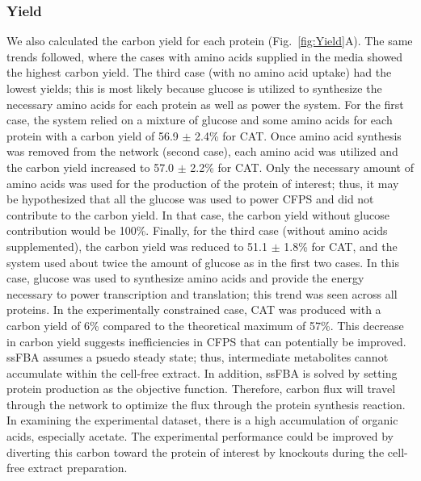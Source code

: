 \documentclass[journal=asbcd6,manuscript=article]{achemso}
\begin{document}
\subsubsection{Yield}
We also calculated the carbon yield for each protein (Fig.~\ref{fig:Yield}A).
The same trends followed, where the cases with amino acids supplied in the media showed the highest carbon yield.
The third case (with no amino acid uptake) had the lowest yields; this is most likely because glucose is utilized to synthesize the necessary amino acids for each protein as well as power the system.
For the first case, the system relied on a mixture of glucose and some amino acids for each protein with a carbon yield of 56.9 $\pm$ 2.4\% for CAT.
Once amino acid synthesis was removed from the network (second case), each amino acid was utilized and the carbon yield increased to 57.0 $\pm$ 2.2\% for CAT.
Only the necessary amount of amino acids was used for the production of the protein of interest; thus, it may be hypothesized that all the glucose was used to power CFPS and did not contribute to the carbon yield.
In that case, the carbon yield without glucose contribution would be 100\%.
Finally, for the third case (without amino acids supplemented), the carbon yield was reduced to 51.1 $\pm$ 1.8\% for CAT, and the system used about twice the amount of glucose as in the first two cases.
In this case, glucose was used to synthesize amino acids and provide the energy necessary to power transcription and translation; this trend was seen across all proteins.
In the experimentally constrained case, CAT was produced with a carbon yield of 6\% compared to the theoretical maximum of 57\%.
This decrease in carbon yield suggests inefficiencies in CFPS that can potentially be improved.
ssFBA assumes a psuedo steady state; thus, intermediate metabolites cannot accumulate within the cell-free extract.
In addition, ssFBA is solved by setting protein production as the objective function.
Therefore, carbon flux will travel through the network to optimize the flux through the protein synthesis reaction.
In examining the experimental dataset, there is a high accumulation of organic acids, especially acetate.
The experimental performance could be improved by diverting this carbon toward the protein of interest by knockouts during the cell-free extract preparation.
\end{document}
